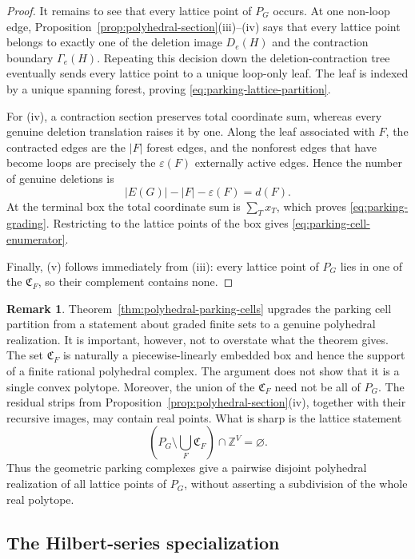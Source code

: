 \documentclass[11pt]{article}
\theoremstyle{plain}
\theoremstyle{definition}
\newtheorem{remark}[theorem]{Remark}
\newcommand{\fC}{\mathfrak C}    %
\newcommand{\eps}{\varepsilon}
\newcommand{\ZZ}{\mathbb Z}
\numberwithin{equation}{section}
\begin{document}
\begin{proof}
It remains to see that every lattice point of $P_G$ occurs.  At one
non-loop edge, Proposition~\ref{prop:polyhedral-section}(iii)--(iv) says that
every lattice point belongs to exactly one of the deletion image $D_e(H)$ and
the contraction boundary $\Gamma_e(H)$.  Repeating this decision down the
deletion-contraction tree eventually sends every lattice point to a unique
loop-only leaf.  The leaf is indexed by a unique spanning forest, proving
\eqref{eq:parking-lattice-partition}.

For (iv), a contraction section preserves total coordinate sum, whereas every
genuine deletion translation raises it by one.  Along the leaf associated with
$F$, the contracted edges are the $|F|$ forest edges, and the nonforest edges
that have become loops are precisely the $\eps(F)$ externally active
edges.  Hence the number of genuine deletions is
\[
   |E(G)|-|F|-\eps(F)=d(F).
\]
At the terminal box the total coordinate sum is $\sum_Tx_T$, which proves
\eqref{eq:parking-grading}.  Restricting to the lattice points of the box gives
\eqref{eq:parking-cell-enumerator}.

Finally, (v) follows immediately from (iii): every lattice point of $P_G$ lies
in one of the $\fC_F$, so their complement contains none.
\end{proof}

\begin{remark}\label{rem:not-subdivision}
  Theorem~\ref{thm:polyhedral-parking-cells} upgrades the parking cell partition from a statement about graded finite sets to a genuine polyhedral realization.  It is important, however, not to overstate what the theorem gives.
  The set $\fC_F$ is naturally a piecewise-linearly embedded box and hence the support of a finite rational polyhedral complex. The argument does not show that it is a single convex polytope.
  Moreover, the union of the $\fC_F$ need not be all of $P_G$.  The residual strips from Proposition~\ref{prop:polyhedral-section}(iv), together with their recursive images, may contain real points.
  What is sharp is the lattice statement
\[
 \left(
 P_G\setminus\bigcup_F\fC_F
 \right)\cap\ZZ^V=\varnothing.
\]
Thus the geometric parking complexes give a pairwise disjoint polyhedral realization
of all lattice points of $P_G$, without asserting a subdivision of the whole real polytope.
\end{remark}

\subsection{The Hilbert-series specialization}
\label{subsec:hilbert-specialization}
\end{document}
